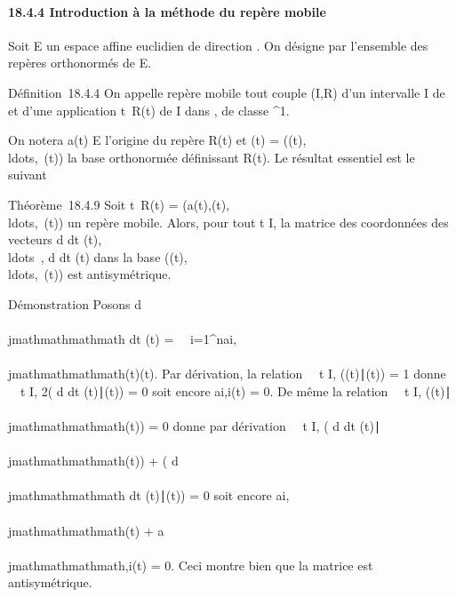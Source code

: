 \paragraph{18.4.4 Introduction à la méthode du repère mobile}

Soit E un espace affine euclidien de direction \vecE.
On désigne par  l'ensemble des repères orthonormés de E.

Définition~18.4.4 On appelle repère mobile tout couple (I,R) d'un
intervalle I de ~ et d'une application t\mapsto~R(t)
de I dans , de classe ^1.

On notera a(t) \in E l'origine du repère R(t) et (t) =
((t),\\ldots,\overrightarrowen~(t))
la base orthonormée définissant R(t). Le résultat essentiel est le
suivant

Théorème~18.4.9 Soit t\mapsto~R(t) =
(a(t),(t),\\ldots,\overrightarrowen~(t))
un repère mobile. Alors, pour tout t \in I, la matrice des coordonnées des
vecteurs  d
\over dt
(t),\\ldots~,
d\overrightarrowen \over
dt (t) dans la base
((t),\\ldots,\overrightarrowen~(t))
est antisymétrique.

Démonstration Posons  d\overrightarrowe\\\\jmathmathmathmath
\over dt (t) =\
\sum ~
i=1^nai,\\\\jmathmathmathmath(t)\overrightarrowei(t).
Par dérivation, la relation \forall~~t \in I,
(\overrightarrowei(t)∣\overrightarrowei(t))
= 1 donne \forall~~t \in I, 2(
d\overrightarrowei \over
dt
(t)∣\overrightarrowei(t))
= 0 soit encore ai,i(t) = 0. De même la relation
\forall~~t \in I,
(\overrightarrowei(t)∣\overrightarrowe\\\\jmathmathmathmath(t))
= 0 donne par dérivation \forall~~t \in I, (
d\overrightarrowei \over
dt
(t)∣\overrightarrowe\\\\jmathmathmathmath(t))
+ ( d\overrightarrowe\\\\jmathmathmathmath
\over dt
(t)∣\overrightarrowei(t))
= 0 soit encore ai,\\\\jmathmathmathmath(t) + a\\\\jmathmathmathmath,i(t) = 0. Ceci montre
bien que la matrice est antisymétrique.

